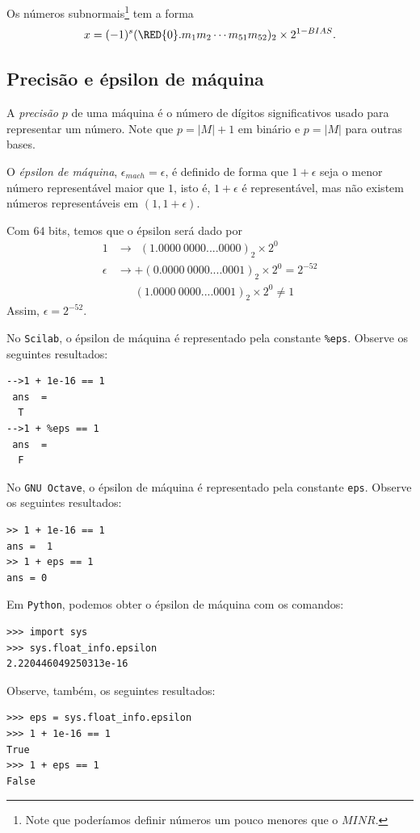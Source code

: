 Os números subnormais\footnote{Note que poderíamos definir números um pouco menores que o $MINR$.} tem a forma
\begin{equation}  x=(-1)^{s}(\RED{0}.m_{1}m_{2}\cdots m_{51}m_{52})_2 \times 2^{1-BIAS}. \end{equation}

\subsection{Precisão e épsilon de máquina}

A \emph{precisão} $p$ de uma máquina é o número de dígitos significativos usado para representar um número. Note que $p=|M|+1$ em binário e $p=|M|$ para outras bases.

O \emph{épsilon de máquina}, $\epsilon_{mach}=\epsilon$, é definido de forma que $1+\epsilon$ seja o menor número representável maior que $1$, isto é, $1+\epsilon$ é representável, mas não existem números representáveis em $(1, 1+\epsilon)$.

\begin{ex}
  Com $64$ bits, temos que o épsilon será dado por
\begin{equation}
  \begin{split}
  1      &\rightarrow ~~(1.0000~0000....0000)_2\times 2^{0} \\
\epsilon &\rightarrow  +(0.0000~0000....0001)_2\times 2^{0}  = 2^{-52} \\
         &      ~~~~~~~ (1.0000~0000....0001)_2\times 2^{0} \neq 1
  \end{split}
\end{equation}
Assim, $\epsilon = 2^{-52}$.
\end{ex}

\ifisscilab
\begin{obs}
  No \verb+Scilab+, o épsilon de máquina é representado pela constante \verb+%eps+. Observe os seguintes resultados:
\begin{verbatim}
-->1 + 1e-16 == 1
 ans  =
  T
-->1 + %eps == 1
 ans  =
  F
\end{verbatim}
\end{obs}
\fi
\ifisoctave
\begin{obs}
  No \verb+GNU Octave+, o épsilon de máquina é representado pela constante \verb+eps+. Observe os seguintes resultados:
\begin{verbatim}
>> 1 + 1e-16 == 1
ans =  1
>> 1 + eps == 1
ans = 0
\end{verbatim}
\end{obs}
\fi
\ifispython
  Em \verb+Python+, podemos obter o épsilon de máquina com os comandos:
\begin{verbatim}
>>> import sys
>>> sys.float_info.epsilon
2.220446049250313e-16
\end{verbatim}
Observe, também, os seguintes resultados:
\begin{verbatim}
>>> eps = sys.float_info.epsilon
>>> 1 + 1e-16 == 1
True
>>> 1 + eps == 1
False
\end{verbatim}
\fi

